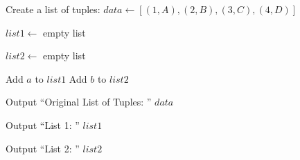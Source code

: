 \begin{algorithm}
\caption{Unzip a List of Tuples into Two Lists}
\begin{algorithmic}[1]

\STATE Create a list of tuples:
\STATE $data \gets [(1,A), (2,B), (3,C), (4,D)]$

\STATE $list1 \gets$ empty list

\STATE $list2 \gets$ empty list

    \STATE Add $a$ to $list1$
    \STATE Add $b$ to $list2$
\ENDFOR

\STATE Output ``Original List of Tuples: '' $data$

\STATE Output ``List 1: '' $list1$

\STATE Output ``List 2: '' $list2$

\end{algorithmic}
\end{algorithm}